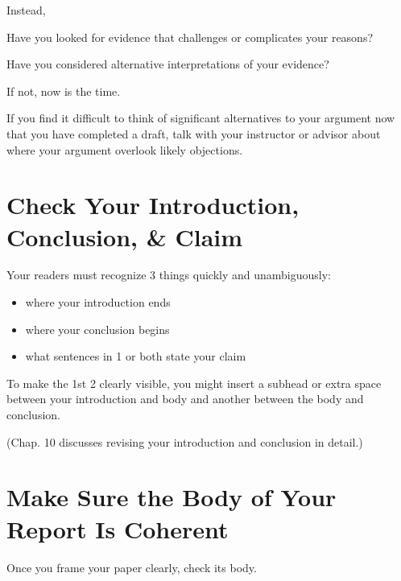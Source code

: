 \documentclass[oneside]{book}
\numberwithin{equation}{section}
\begin{document}
Instead, 


Have you looked for evidence that challenges or complicates your reasons?

Have you considered alternative interpretations of your evidence?

If not, now is the time.

If you find it difficult to think of significant alternatives to your argument now that you have completed a draft, talk with your instructor or advisor about where your argument overlook likely objections.

\section{Check Your Introduction, Conclusion, \& Claim}
Your readers must recognize 3 things quickly and unambiguously:
\begin{itemize}
    \item where your introduction ends
    \item where your conclusion begins
    \item what sentences in 1 or both state your claim
\end{itemize}
To make the 1st 2 clearly visible, you might insert a subhead or extra space between your introduction and body and another between the body and conclusion.

(Chap. 10 discusses revising your introduction and conclusion in detail.)

\section{Make Sure the Body of Your Report Is Coherent}
Once you frame your paper clearly, check its body.
\end{document}
